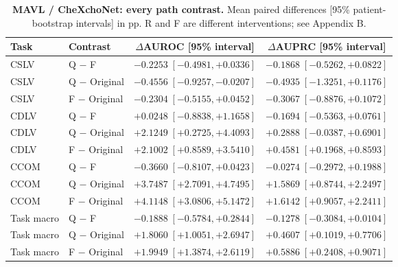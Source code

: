 \begin{table}[tp]
\centering
\caption{\textbf{MAVL / CheXchoNet: every path contrast.} Mean paired differences [95\% patient-bootstrap intervals] in pp. R and F are different interventions; see Appendix B.}
\label{tab:supp-cardiac-path-ci-mavl}
\small
\setlength{\tabcolsep}{4pt}
\begin{tabular*}{\textwidth}{@{\extracolsep{\fill}}llcc@{}}
\toprule
Task & Contrast & $\Delta$AUROC [95\% interval] & $\Delta$AUPRC [95\% interval] \\
\midrule
CSLV & Q $-$ F & $-0.2253\;[-0.4981,+0.0336]$ & $-0.1868\;[-0.5262,+0.0822]$ \\
CSLV & Q $-$ Original & $-0.4556\;[-0.9257,-0.0207]$ & $-0.4935\;[-1.3251,+0.1176]$ \\
CSLV & F $-$ Original & $-0.2304\;[-0.5155,+0.0452]$ & $-0.3067\;[-0.8876,+0.1072]$ \\
CDLV & Q $-$ F & $+0.0248\;[-0.8838,+1.1658]$ & $-0.1694\;[-0.5363,+0.0761]$ \\
CDLV & Q $-$ Original & $+2.1249\;[+0.2725,+4.4093]$ & $+0.2888\;[-0.0387,+0.6901]$ \\
CDLV & F $-$ Original & $+2.1002\;[+0.8589,+3.5410]$ & $+0.4581\;[+0.1968,+0.8593]$ \\
CCOM & Q $-$ F & $-0.3660\;[-0.8107,+0.0423]$ & $-0.0274\;[-0.2972,+0.1988]$ \\
CCOM & Q $-$ Original & $+3.7487\;[+2.7091,+4.7495]$ & $+1.5869\;[+0.8744,+2.2497]$ \\
CCOM & F $-$ Original & $+4.1148\;[+3.0806,+5.1472]$ & $+1.6142\;[+0.9057,+2.2411]$ \\
Task macro & Q $-$ F & $-0.1888\;[-0.5784,+0.2844]$ & $-0.1278\;[-0.3084,+0.0104]$ \\
Task macro & Q $-$ Original & $+1.8060\;[+1.0051,+2.6947]$ & $+0.4607\;[+0.1019,+0.7706]$ \\
Task macro & F $-$ Original & $+1.9949\;[+1.3874,+2.6119]$ & $+0.5886\;[+0.2408,+0.9071]$ \\
\bottomrule
\end{tabular*}
\end{table}

